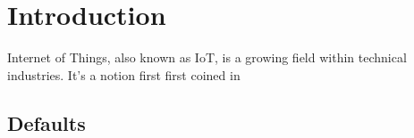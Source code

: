 \chapter{Introduction\label{chap:introduction}}

Internet of Things, also known as IoT, is a growing field within technical industries. It's a notion first first coined in \cite{ashton1999introduction}

\section{Defaults}




